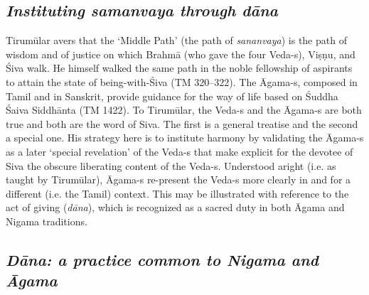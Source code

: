 \subsection*{\textit{Instituting samanvaya through dāna}}

Tirumūlar avers that the ‘Middle Path’ (the path of \textit{sananvaya}) is the path of wisdom and of justice on which Brahmā (who gave the four Veda-s), Viṣṇu, and Śiva walk. He himself walked the same path in the noble fellowship of aspirants to attain the state of being-with-Śiva (TM 320–322). The Āgama-s, composed in Tamil and in Sanskrit, provide guidance for the way of life based on Śuddha Śaiva Siddhānta (TM 1422). To Tirumūlar, the Veda-s and the Āgama-s are both true and both are the word of Siva. The first is a general treatise and the second a special one. His strategy here is to institute harmony by validating the Āgama-s as a later ‘special revelation’ of the Veda-s that make explicit for the devotee of Siva the obscure liberating content of the Veda-s. Understood aright (i.e. as taught by Tirumūlar), Āgama-s re-present the Veda-s more clearly in and for a different (i.e. the Tamil) context. This may be illustrated with reference to the act of giving (\textit{dāna}), which is recognized as a sacred duty in both Āgama and Nigama traditions.


\subsection*{\textit{Dāna: a practice common to Nigama and Āgama}}

\vskip -7pt

